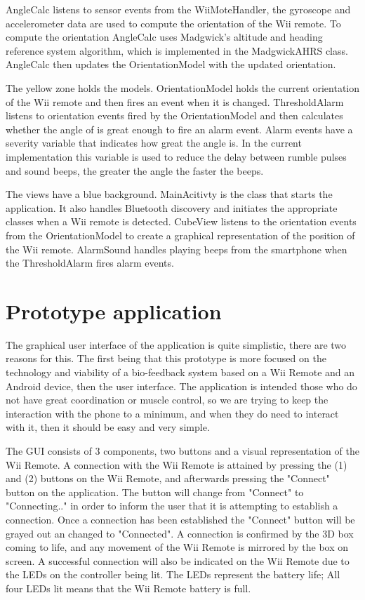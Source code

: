 AngleCalc listens to sensor events from the WiiMoteHandler, the gyroscope and accelerometer data are used to compute the orientation of the Wii remote. To compute the orientation AngleCalc uses Madgwick's altitude and heading reference system algorithm, which is implemented in the MadgwickAHRS class. AngleCalc then updates the OrientationModel with the updated orientation.

The yellow zone holds the models. OrientationModel holds the current orientation of the Wii remote and then fires an event when it is changed. ThresholdAlarm listens to orientation events fired by the OrientationModel and then calculates whether the angle of is great enough to fire an alarm event. Alarm events have a severity variable that indicates how great the angle is. In the current implementation this variable is used to reduce the delay between rumble pulses and sound beeps, the greater the angle the faster the beeps.

The views have a blue background. MainAcitivty is the class that starts the application. It also handles Bluetooth discovery and initiates the appropriate classes when a Wii remote is detected. CubeView listens to the orientation events from the OrientationModel to create a graphical representation of the position of the Wii remote. AlarmSound handles playing beeps from the smartphone when the ThresholdAlarm fires alarm events. 

\section{Prototype application}
The graphical user interface of the application is quite simplistic, there are two reasons for this. The first being that this prototype is more focused on the technology and viability of a bio-feedback system based on a Wii Remote and an Android device, then the user interface. The application is intended those who do not have great coordination or muscle control, so we are trying to keep the interaction with the phone to a minimum, and when they do need to interact with it, then it should be easy and very simple.

The GUI consists of 3 components, two buttons and a visual representation of the Wii Remote. A connection with the Wii Remote is attained by pressing the (1) and (2) buttons on the Wii Remote, and afterwards pressing the "Connect" button on the application. The button will change from "Connect" to "Connecting.." in order to inform the user that it is attempting to establish a connection. Once a connection has been established the "Connect" button will be grayed out an changed to "Connected". A connection is confirmed by the 3D box coming to life, and any movement of the Wii Remote is mirrored by the box on screen. A successful connection will also be indicated on the Wii Remote due to the LEDs on the controller being lit. The LEDs represent the battery life; All four LEDs lit means that the Wii Remote battery is full.

